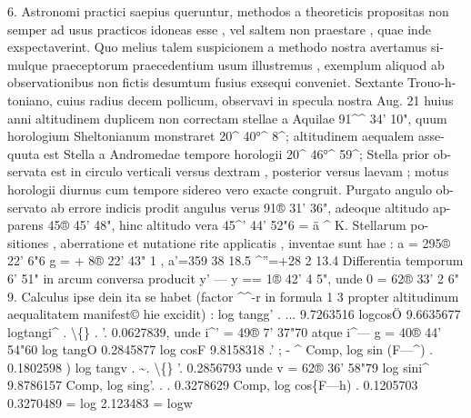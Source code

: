 \documentclass[12pt,a4paper]{article}
\begin{document}
6.
Astronomi  practici  saepius  queruntur,  methodos  a  theoreticis  propositas
non  semper  ad  usus  practicos  idoneas  esse ,  vel  saltem  non  praestare ,  quae  inde
exspectaverint.  Quo  melius  talem  suspicionem  a  methodo  nostra  avertamus  si-
mulque  praeceptorum  praecedentium  usum  illustremus ,  exemplum  aliquod  ab
observationibus  non  fictis  desumtum  fusius  exsequi  conveniet.  Sextante  Trouo-h-
toniano,  cuius  radius  decem  pollicum,  observavi  in  specula  nostra  Aug.  21  huius
anni  altitudinem  duplicem  non  correctam  stellae  a  Aquilae  91\^{}\^{}  34'  10",  quum
horologium  Sheltonianum  monstraret  20\^{}  40°\^{}  8\^{};  altitudinem  aequalem  asse-
quuta  est  Stella  a  Andromedae  tempore  horologii  20\^{}  46°\^{}  59\^{};  Stella  prior  ob-
servata  est  in  circulo  verticali  versus  dextram ,  posterior  versus  laevam ;  motus
horologii  diurnus  cum  tempore  sidereo  vero  exacte  congruit.  Purgato  angulo  ob-
servato  ab  errore  indicis  prodit  angulus  verus  91®  31'  36",  adeoque  altitudo  ap-
parens  45®  45'  48",  hinc  altitudo  vera  45\^{}'  44'  52"6  =  ä  \^{}  K.  Stellarum  po-
sitiones ,  aberratione  et  nutatione  rite  applicatis ,  inventae  sunt  hae :
a  =  295®  22'      6"6  g  =  +    8®  22'    43"  1
,  a'=359     38     18.5  \^{}''=+28       2     13.4
Differentia  temporum  6'  51"  in  arcum  conversa  producit  y' --- y  ==  1®  42'  4  5",
unde  0  =  62®  33'  2  6"  9.  Calculus  ipse  dein  ita  se  habet  (factor  \^{}\^{}-r  in  formula
1 3  propter  altitudinum  aequalitatem  manifest©  hie  excidit) :
log  tangg'      .      ...      9.7263516
logcosÖ
9.6635677
logtangi\^{}      .      \textbackslash\{\}     .      '.     0.0627839,    unde    i\^{}' =  49®     7'  37"70
atque     i\^{}--- g  =  40®  44' 54"60
log  tangO    0.2845877
log  cosF    9.8158318  .'  ;  -     \^{}
Comp,  log  sin (F---\^{})  .  0.1802598  )
log  tangv  .     \textasciitilde{}.     \textbackslash\{\}     '.  0.2856793      unde     v  =  62®  36'  58"79
log  sini\^{}
9.8786157
Comp,  log  sing'.     .     .     0.3278629
Comp,  log  cos\{F---h)  .     0.1205703
0.3270489  =  log  2.123483  =  logw

\newpage
\end{document}
